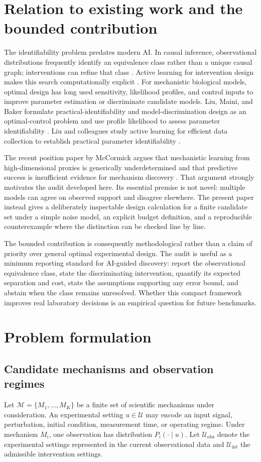 \documentclass[11pt]{article}
\newcommand{\Mcal}{\mathcal{M}}
\newcommand{\Ucal}{\mathcal{U}}
\begin{document}
\section{Relation to existing work and the bounded contribution}
The identifiability problem predates modern AI. In causal inference, observational distributions frequently identify an equivalence class rather than a unique causal graph; interventions can refine that class \citep{pearl2009}. Active learning for intervention design makes this search computationally explicit \citep{zhang2023}. For mechanistic biological models, optimal design has long used sensitivity, likelihood profiles, and control inputs to improve parameter estimation or discriminate candidate models. Liu, Maini, and Baker formulate practical-identifiability and model-discrimination design as an optimal-control problem and use profile likelihood to assess parameter identifiability \citep{liu2026}. Liu and colleagues study active learning for efficient data collection to establish practical parameter identifiability \citep{liu_active2025}.

The recent position paper by McCormick argues that mechanistic learning from high-dimensional proxies is generically underdetermined and that predictive success is insufficient evidence for mechanism discovery \citep{mccormick2026}. That argument strongly motivates the audit developed here. Its essential premise is not novel: multiple models can agree on observed support and disagree elsewhere. The present paper instead gives a deliberately inspectable design calculation for a finite candidate set under a simple noise model, an explicit budget definition, and a reproducible counterexample where the distinction can be checked line by line.

The bounded contribution is consequently methodological rather than a claim of priority over general optimal experimental design. The audit is useful as a minimum reporting standard for AI-guided discovery: report the observational equivalence class, state the discriminating intervention, quantify its expected separation and cost, state the assumptions supporting any error bound, and abstain when the class remains unresolved. Whether this compact framework improves real laboratory decisions is an empirical question for future benchmarks.

\section{Problem formulation}
\subsection{Candidate mechanisms and observation regimes}
Let $\Mcal=\{M_1,\ldots,M_K\}$ be a finite set of scientific mechanisms under consideration. An experimental setting $u\in\Ucal$ may encode an input signal, perturbation, initial condition, measurement time, or operating regime. Under mechanism $M_i$, one observation has distribution $P_i(\cdot\mid u)$. Let $\Ucal_{\mathrm{obs}}$ denote the experimental settings represented in the current observational data and $\Ucal_{\mathrm{int}}$ the admissible intervention settings.
\end{document}

